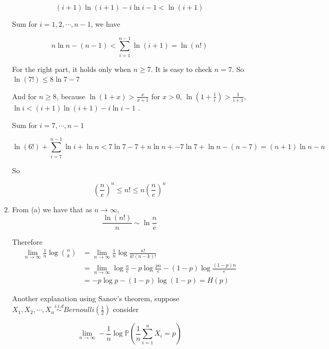 \documentclass[a4paper]{article}
\begin{document}
\begin{enumerate}
\begin{enumerate}
\begin{equation}
  (i+1) \ln(i+1) - i\ln i -1 < \ln(i+1)
\end{equation}

Sum for $i=1,2,\cdots,n-1$, we have 

\begin{equation}
  n\ln n - (n-1) < \sum_{i=1}^{n-1} \ln(i+1) = \ln (n!)
\end{equation}

For the right part, it holds only when $n\geqslant 7$. It is easy to check $n =7 $. So $\ln(7!) \leqslant 8\ln 7 - 7$

And for $n \geqslant 8$, because $\ln (1+x) > \frac{x}{x+1}$ for $x>0$, $\ln (1+ \frac 1 i ) > \frac{1}{i+1}$, $\ln i < (i+1)\ln (i+1) - i \ln i -1$ . 

Sum for $i=7,\cdots, n-1$

\begin{equation}
  \ln(6!)  + \sum_{i=7}^{n-1} \ln i + \ln n < 7\ln 7 - 7  + n\ln n + - 7\ln  7 + \ln n  - (n-7) = (n+1) \ln n - n
\end{equation}

So 

\begin{equation}
  \left(\frac{n}{e}\right)^{n} \leqslant n ! \leqslant n\left(\frac{n}{e}\right)^{n}
\end{equation}

\item From (a) we have that as $n \to \infty$,
\begin{equation}
  \frac{\ln (n!)}{n} \sim \ln \frac{n}{e}
\end{equation}

Therefore
\begin{equation}
  \begin{aligned}
    \lim _{n \to \infty} \frac{1}{n} \log \binom{n}{k} & = \lim _{n \to \infty} \frac{1}{n} \log \frac{n!}{k!(n-k)!}  \\ & = \lim _{n \to \infty} \log \frac{n}{e} - p \log \frac{pn}{e} - (1-p) \log \frac{(1-p)n}{e} \\
    & = -p\log p - (1-p) \log (1-p) = H(p)
  \end{aligned}
\end{equation}

Another explanation using Sanov's theorem, suppose $X_1,X_2,\cdots,X_n \overset{i.i.d}{\sim} Bernoulli(\frac{1}{2})$ consider 

\begin{equation}
  \lim_{n\to \infty} -\frac{1}{n} \log \mathbb{P}(\frac{1}{n} \sum_{i=1}^n X_i= p) 
\end{equation}


\end{enumerate}
\end{enumerate}
\end{document}
